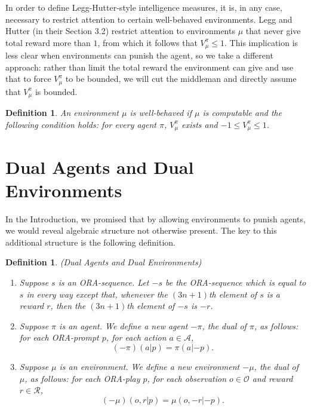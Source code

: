 \documentclass{article}
\newtheorem{definition}[theorem]{Definition}
\begin{document}
In order to define Legg-Hutter-style
intelligence measures, it is, in any case, necessary to restrict attention to
certain well-behaved environments. Legg and Hutter (in their Section 3.2)
restrict attention to environments $\mu$ that never give total reward more than $1$,
from which it follows that $V^\pi_\mu\leq 1$. This implication is less clear
when environments can punish the agent, so we take a different approach:
rather than limit the total reward the environment can give and use that to
force $V^\pi_\mu$ to be bounded, we will cut the middleman and
directly assume that $V^\pi_\mu$ is bounded.

\begin{definition}
    An environment $\mu$ is \emph{well-behaved} if $\mu$ is computable and the following
    condition holds: for every agent $\pi$, $V^\pi_\mu$ exists and
    $-1\leq V^\pi_\mu\leq 1$.
\end{definition}

\section{Dual Agents and Dual Environments}
\label{dualsection}

In the Introduction, we promised that by allowing environments to punish agents,
we would reveal algebraic structure not otherwise present. The key to this additional
structure is the following definition.

\begin{definition}
(Dual Agents and Dual Environments)
\begin{enumerate}
    \item
    Suppose $s$ is an ORA-sequence. Let $-s$
    be the ORA-sequence which is equal to $s$ in every way except that,
    whenever the $(3n+1)$th element of $s$ is a reward $r$,
    then the $(3n+1)$th element of $-s$ is $-r$.
    \item
    Suppose $\pi$ is an agent.
    We define a new agent $-\pi$, the \emph{dual} of $\pi$,
    as follows:
    for each ORA-prompt $p$, for each action $a\in\mathcal A$,
    \[(-\pi)(a|p)=\pi(a|{-p}).\]
    \item
    Suppose $\mu$ is an environment.
    We define a new environment $-\mu$, the \emph{dual} of $\mu$,
    as follows:
    for each ORA-play $p$, for each observation $o\in\mathcal O$
    and reward $r\in\mathcal R$,
    \[(-\mu)(o,r|p)=\mu(o,-r|{-p}).\]
\end{enumerate}
\end{definition}
\end{document}
